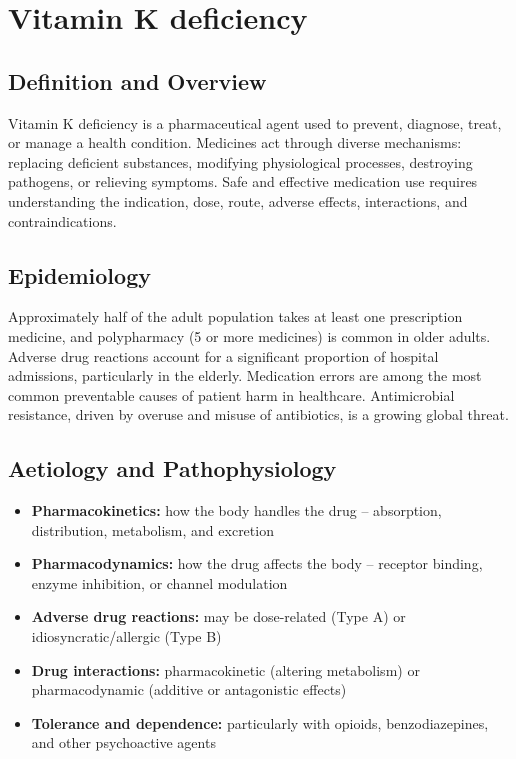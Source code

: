 \chapter{Vitamin K deficiency}

\section*{Definition and Overview}
Vitamin K deficiency is a pharmaceutical agent used to prevent, diagnose, treat, or manage a health condition. Medicines act through diverse mechanisms: replacing deficient substances, modifying physiological processes, destroying pathogens, or relieving symptoms. Safe and effective medication use requires understanding the indication, dose, route, adverse effects, interactions, and contraindications.

\section*{Epidemiology}
Approximately half of the adult population takes at least one prescription medicine, and polypharmacy (5 or more medicines) is common in older adults. Adverse drug reactions account for a significant proportion of hospital admissions, particularly in the elderly. Medication errors are among the most common preventable causes of patient harm in healthcare. Antimicrobial resistance, driven by overuse and misuse of antibiotics, is a growing global threat.

\section*{Aetiology and Pathophysiology}
\begin{itemize}
    \item \textbf{Pharmacokinetics:} how the body handles the drug -- absorption, distribution, metabolism, and excretion
    \item \textbf{Pharmacodynamics:} how the drug affects the body -- receptor binding, enzyme inhibition, or channel modulation
    \item \textbf{Adverse drug reactions:} may be dose-related (Type A) or idiosyncratic/allergic (Type B)
    \item \textbf{Drug interactions:} pharmacokinetic (altering metabolism) or pharmacodynamic (additive or antagonistic effects)
    \item \textbf{Tolerance and dependence:} particularly with opioids, benzodiazepines, and other psychoactive agents
\end{itemize}

